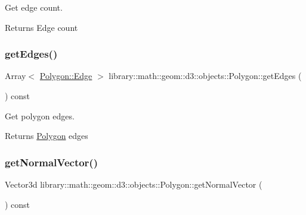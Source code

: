 Get edge count. 

\begin{DoxyReturn}{Returns}
Edge count 
\end{DoxyReturn}
\mbox{\label{classlibrary_1_1math_1_1geom_1_1d3_1_1objects_1_1_polygon_a90b876b752d49e7f7c65976d2f367086}} 
\subsubsection{\texorpdfstring{get\+Edges()}{getEdges()}}
{\footnotesize\ttfamily Array$<$ \hyperlink{classlibrary_1_1math_1_1geom_1_1d3_1_1objects_1_1_polygon_a7962e0559e972fe43eef942ce318fb8d}{Polygon\+::\+Edge} $>$ library\+::math\+::geom\+::d3\+::objects\+::\+Polygon\+::get\+Edges (\begin{DoxyParamCaption}{ }\end{DoxyParamCaption}) const}



Get polygon edges. 

\begin{DoxyReturn}{Returns}
\hyperlink{classlibrary_1_1math_1_1geom_1_1d3_1_1objects_1_1_polygon}{Polygon} edges 
\end{DoxyReturn}
\mbox{\label{classlibrary_1_1math_1_1geom_1_1d3_1_1objects_1_1_polygon_a9df6a1cf7b2d48b9bca560d8794df831}} 
\subsubsection{\texorpdfstring{get\+Normal\+Vector()}{getNormalVector()}}
{\footnotesize\ttfamily Vector3d library\+::math\+::geom\+::d3\+::objects\+::\+Polygon\+::get\+Normal\+Vector (\begin{DoxyParamCaption}{ }\end{DoxyParamCaption}) const}



